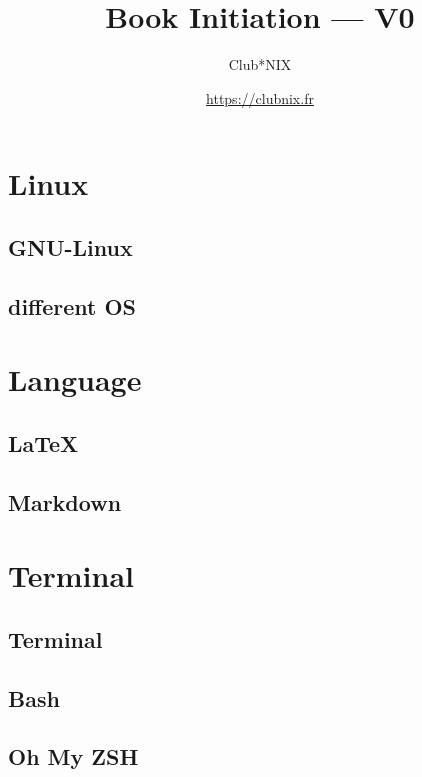 \documentclass[french, a4paper, 12pt, titlepage]{article}
\begin{document}
\title{Book Initiation --- V0}
\author{Club*NIX}

\date{\url{https://clubnix.fr}}%

\maketitle

\tableofcontents

\newpage


\section{Linux}
 \subsection{GNU-Linux}
    
 \subsection{different OS}
    
    
\section{Language}
  \subsection{LaTeX}
    
  \subsection{Markdown}
    
    
\section{Terminal}
  \subsection{Terminal}
    
  \subsection{Bash}
    
  \subsection{Oh My ZSH}
    
    
\end{document}
